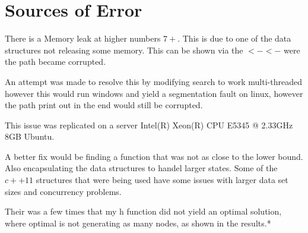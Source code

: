 \documentclass[12pt]{article}
\begin{document}
\section{ Sources of Error}

There is a Memory leak at higher numbers $7+$. 
This is due to one of the data structures not releasing some memory.
This can be shown via the $<-<-$ were the path became corrupted.

An attempt was made to resolve this by modifying search to work multi-threaded 
however this would run windows and yield a segmentation fault on linux, however the 
path print out in the end would still be corrupted. 

This issue was replicated on a server Intel(R) Xeon(R) CPU E5345  @ 2.33GHz 8GB Ubuntu.

A better fix would be finding a function that was not as close to the lower bound. Also 
encapsulating the data structures to handel larger states. Some of the $c++11$ structures
that were being used have some issues with larger data set sizes and concurrency problems.

Their was a few times that my h function did not yield an optimal solution, where optimal is not
generating as many nodes, as shown in the results.*


\end{document}
